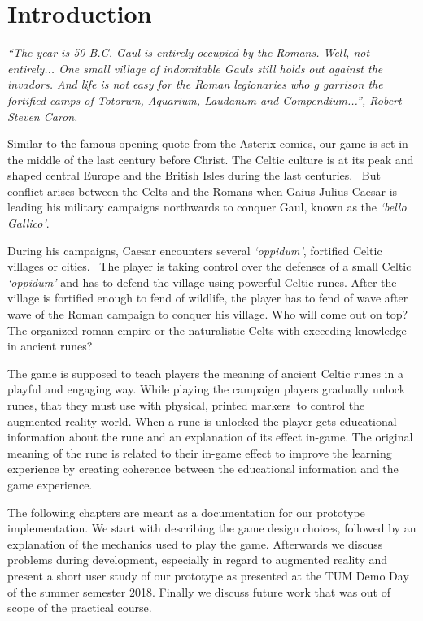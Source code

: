 \section{Introduction}
\label{sec:introduction}

\textit{``The year is 50 B.C. Gaul is entirely occupied by the Romans. Well, not entirely... One small village of indomitable Gauls still holds out against the invadors. And life is not easy for the Roman legionaries who g garrison the fortified camps of Totorum, Aquarium, Laudanum and Compendium...'', Robert Steven Caron.}~\cite{asterix-beginning}

Similar to the famous opening quote from the Asterix comics, our game is set in the middle of the last century before Christ. The Celtic culture is at its peak and shaped central Europe and the British Isles during the last centuries.~\cite{celtic-expansion} But conflict arises between the Celts and the Romans when Gaius Julius Caesar is leading his military campaigns northwards to conquer Gaul, known as the \textit{`bello Gallico'}.

During his campaigns, Caesar encounters several \textit{`oppidum'}, fortified Celtic villages or cities.~\cite{collis-oppidum} The player is taking control over the defenses of a small Celtic \textit{`oppidum'} and has to defend the village using powerful Celtic runes. After the village is fortified enough to fend of wildlife, the player has to fend of wave after wave of the Roman campaign to conquer his village. Who will come out on top? The organized roman empire or the naturalistic Celts with exceeding knowledge in ancient runes?

The game is supposed to teach players the meaning of ancient Celtic runes in a playful and engaging way. While playing the campaign players gradually unlock runes, that they must use with physical, printed markers\footnotemark \ to control the augmented reality world.
When a rune is unlocked the player gets educational information about the rune and an explanation of its effect in-game. The original meaning of the rune is related to their in-game effect to improve the learning experience by creating coherence between the educational information and the game experience.

The following chapters are meant as a documentation for our prototype implementation. We start with describing the game design choices, followed by an explanation of the mechanics used to play the game. Afterwards we discuss problems during development, especially in regard to augmented reality and present a short user study of our prototype as presented at the TUM Demo Day of the summer semester 2018. Finally we discuss future work that was out of scope of the practical course.






